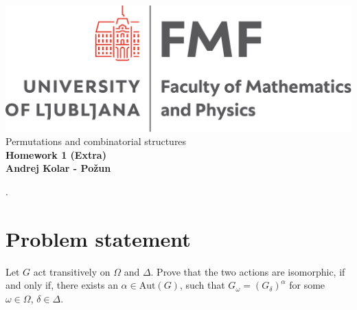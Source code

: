 \documentclass{article}
\begin{document}
\begin{titlepage}
    \begin{center}
        \vspace*{1cm}
        \Large
\includegraphics[width=.8\linewidth]{slike/fmflogo.pdf}\\
        \Large
\vspace{1cm}
        Permutations and combinatorial structures\\
        \huge
        \textbf{Homework 1 (Extra)\\}
\Large  
        \vspace{1cm}
        \textbf{Andrej Kolar - Po{\v z}un\\}


\vfill
\normalsize
\end{center}. 
\end{titlepage}
\newpage
{}
\section*{Problem statement}
Let $G$ act transitively on $\Omega$ and $\Delta$. 
Prove that the two actions are isomorphic, if and only if, there exists an $\alpha \in \mathrm{Aut}(G)$, such that $G_\omega = (G_\delta)^\alpha$ for some $\omega \in \Omega$, $\delta \in \Delta$. 
\end{document}
